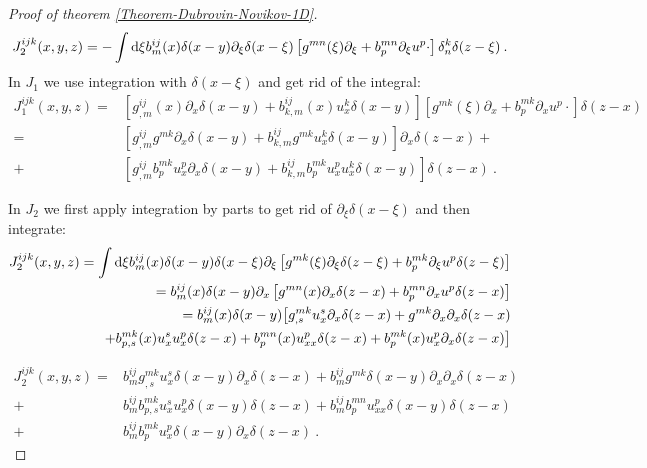\begin{proof}[Proof of theorem \ref{Theorem-Dubrovin-Novikov-1D}]
\begin{align*}
        J_2^{ijk}(x,y,z) = - \int \mathrm{d} \xi b^{ij}_m(x) \delta(x-y) \partial_\xi \delta(x-\xi) \left[ g^{mn}(\xi) \partial_\xi + b^{mn}_p \partial_\xi u^p \cdot \right] \delta^k_n \delta(z-\xi)  \:.
    \end{align*}
    In $J_1$ we use integration with $\delta(x-\xi)$ and get rid of the integral:
    \begin{align*}
        J_1^{ijk}(x,y,z) =& \left[ g^{ij}_{,m}(x) \partial_x \delta(x-y) + b^{ij}_{k,m}(x) u^k_x \delta(x-y) \right] 
        \left[ g^{mk}(\xi) \partial_x + b^{mk}_p \partial_x u^p \cdot \right] \delta(z-x)
        \\
        =& \left[ g^{ij}_{,m} g^{mk} \partial_x \delta(x-y) + b^{ij}_{k,m} g^{mk} u^k_x \delta(x-y) \right] \partial_x \delta(z-x) + 
        \\
        +& \left[ g^{ij}_{,m} b^{mk}_p u^p_x \partial_x \delta(x-y) + b^{ij}_{k,m} b^{mk}_p u_x^p  u_x^k \delta(x-y) \right] \delta(z-x) \:.
    \end{align*}

    In $J_2$ we first apply integration by parts to get rid of $\partial_\xi \delta(x-\xi)$ and then integrate:
    \begin{align*}
        J_2^{ijk}(x,y,z) = \int \mathrm{d} \xi b^{ij}_m(x) \delta(x-y) \delta(x-\xi) \partial_\xi \left[ g^{mk}(\xi) \partial_\xi \delta(z-\xi) + b^{mk}_p \partial_\xi u^p \delta(z-\xi) \right]
        \\ = b^{ij}_m(x) \delta(x-y) \partial_x \left[ g^{mn}(x) \partial_x \delta(z-x) + b^{mn}_p \partial_x u^p \delta(z-x) \right]
        \\ = b^{ij}_m(x) \delta(x-y) \big[ g^{mk}_{,s} u^s_x \partial_x \delta (z-x) + g^{mk} \partial_x \partial_x \delta (z-x) 
        \\ + b^{mk}_{p,s}(x) u^s_x u^p_x \delta (z-x) + b^{mn}_{p}(x) u^p_{xx} \delta (z-x) + b^{mk}_{p}(x) u^p_x \partial_x \delta (z-x) \big]
    \end{align*}

    \begin{align*}
        J_2^{ijk}(x,y,z) =& b^{ij}_m g^{mk}_{,s} u^s_x \delta (x-y) \partial_x \delta (z-x) 
        + b^{ij}_m g^{mk} \delta(x-y) \partial_x \partial_x \delta (z-x) 
        \\ +& b^{ij}_m b^{mk}_{p,s} u^s_x u^p_x \delta (x-y) \delta (z-x)
        + b^{ij}_m b^{mn}_p u^p_{xx} \delta (x-y) \delta(z-x) 
        \\ +& b^{ij}_m b^{mk}_p u^p_x \delta(x-y) \partial_x \delta(z-x) \:.
    \end{align*}


\end{proof}
